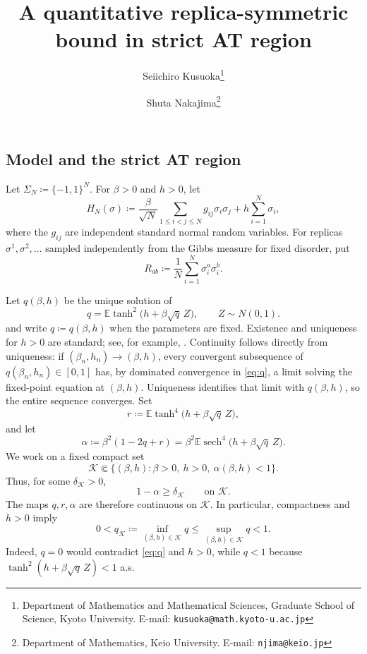 \documentclass[11pt]{article}
\title{A quantitative replica-symmetric bound in strict AT region}
\author{
  Seiichiro Kusuoka\thanks{Department of Mathematics and Mathematical Sciences, Graduate School of Science, Kyoto University. E-mail: \texttt{kusuoka@math.kyoto-u.ac.jp}}
  \and
  Shuta Nakajima\thanks{Department of Mathematics, Keio University. E-mail: \texttt{njima@keio.jp}}
}
\date{}
\numberwithin{equation}{section}
\newcommand{\E}{\mathbb{E}}
\newcommand{\1}{\mathbf 1}
\newcommand{\sech}{\operatorname{sech}}
\newcommand{\cK}{\mathcal K}
\begin{document}
\subsection{Model and the strict AT region}

Let $\Sigma_N\coloneqq\{-1,1\}^N$.  For $\beta>0$ and $h>0$, let
\[
 H_N(\sigma)
 \coloneqq
 \frac{\beta}{\sqrt N}\sum_{1\le i<j\le N}g_{ij}\sigma_i\sigma_j
 +h\sum_{i=1}^N\sigma_i ,
\]
where the $g_{ij}$ are independent standard normal random variables.
For replicas $\sigma^1,\sigma^2,\ldots$ sampled independently from the
Gibbs measure for fixed disorder, put
\[
 R_{ab}\coloneqq\frac1N\sum_{i=1}^N\sigma_i^a\sigma_i^b.
\]

Let $q(\beta,h)$ be the unique solution of
\begin{equation}
 q=\E\tanh^2\bigl(h+\beta\sqrt q\,Z\bigr),
 \qquad Z\sim N(0,1).
 \label{eq:q}
\end{equation}
and write $q\coloneqq q(\beta,h)$ when the parameters are fixed.
Existence and uniqueness for $h>0$ are standard; see, for example,
\cite[Proposition~1.3.8]{Talagrand}.  Continuity follows directly from
uniqueness: if $(\beta_n,h_n)\to(\beta,h)$, every convergent
subsequence of $q(\beta_n,h_n)\in[0,1]$ has, by dominated convergence
in \eqref{eq:q}, a limit solving the fixed-point equation at
$(\beta,h)$.  Uniqueness identifies that limit with $q(\beta,h)$, so
the entire sequence converges.
Set
\begin{equation}
 r\coloneqq\E\tanh^4\bigl(h+\beta\sqrt q\,Z\bigr),
 \label{eq:ra}
\end{equation}
and let
\begin{equation}
 \alpha\coloneqq\beta^2(1-2q+r)
 =\beta^2\E\sech^4\bigl(h+\beta\sqrt q\,Z\bigr).
 \label{eq:alpha}
\end{equation}
We work on a fixed compact set
\begin{equation}
 \cK\Subset\{(\beta,h):\beta>0,\ h>0,\ \alpha(\beta,h)<1\}.
 \label{eq:K}
\end{equation}
Thus, for some $\delta_{\cK}>0$,
\begin{equation}
 1-\alpha\ge\delta_{\cK}
 \qquad\text{on }\cK.
 \label{eq:delta}
\end{equation}
The maps $q,r,\alpha$ are therefore continuous on $\cK$.  In
particular, compactness and $h>0$ imply
\begin{equation}
 0<q_{\cK}\coloneqq\inf_{(\beta,h)\in\cK}q
 \le \sup_{(\beta,h)\in\cK}q<1.
 \label{eq:qcompact}
\end{equation}
Indeed, $q=0$ would contradict \eqref{eq:q} and $h>0$, while
$q<1$ because $\tanh^2(h+\beta\sqrt q\,Z)<1$ a.s.
\end{document}
